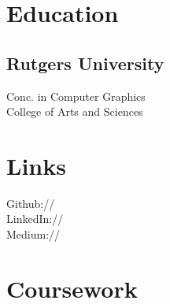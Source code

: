 \documentclass[]{deedy-resume-openfont}
\begin{document}
%
%


%
%

\begin{minipage}[t]{0.33\textwidth} 


\section{Education} 

\subsection{Rutgers University}
\sectionsep

Conc. in Computer Graphics \\
College of Arts and Sciences \\

\sectionsep


\section{Links} 
Github:// \href{https://github.com/11}
{} \\
LinkedIn://  \href{https://www.linkedin.com/in/DougRudolphJr}{} \\
Medium://  \href{https://blogspot.com/DougRudolph}{} \\

\sectionsep


\section{Coursework}

\end{minipage}
\end{document}

